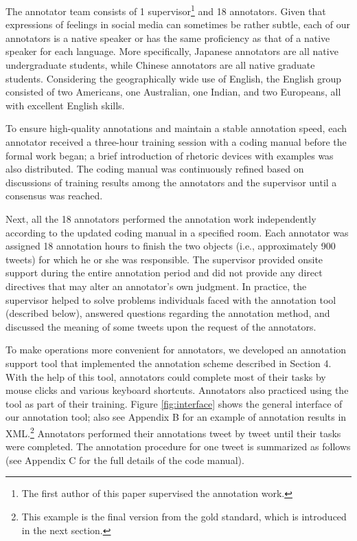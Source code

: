 \documentclass[english]{jnlp_1.4}
\begin{document}
The annotator team consists of 1 supervisor\footnote{The first author of this paper supervised the annotation work.} and 18 annotators. Given that expressions of feelings in social media can sometimes be rather subtle, each of our annotators is a native speaker or has the same proficiency as that of a native speaker for each language. More specifically, Japanese annotators are all native undergraduate students, while Chinese annotators are all native graduate students. Considering the geographically wide use of English, the English group consisted of two Americans, one Australian, one Indian, and two Europeans, all with excellent English skills.

To ensure high-quality annotations and maintain a stable annotation speed, each annotator received a three-hour training session with a coding manual before the formal work began; a brief introduction of rhetoric devices with examples was also distributed. The coding manual was continuously refined based on discussions of training results among the annotators and the supervisor until a consensus was reached. 

Next, all the 18 annotators performed the annotation work independently according to the updated coding manual in a specified room. Each annotator was assigned 18 annotation hours to finish the two objects (i.e., approximately 900 tweets) for which he or she was responsible. The supervisor provided onsite support during the entire annotation period and did not provide any direct directives that may alter an annotator's own judgment. In practice, the supervisor helped to solve problems individuals faced with the annotation tool (described below), answered questions regarding the annotation method, and discussed the meaning of some tweets upon the request of the annotators.

To make operations more convenient for annotators, we developed an annotation support tool that implemented the annotation scheme described in Section 4. With the help of this tool, annotators could complete most of their tasks by mouse clicks and various keyboard shortcuts. Annotators also practiced using the tool as part of their training. Figure \ref{fig:interface} shows the general interface of our annotation tool; also see Appendix B for an example of annotation results in XML.\footnote{This example is the final version from the gold standard, which is introduced in the next section.} Annotators performed their annotations tweet by tweet until their tasks were completed. The annotation procedure for one tweet is summarized as follows (see Appendix C for the full details of the code manual).
\end{document}
